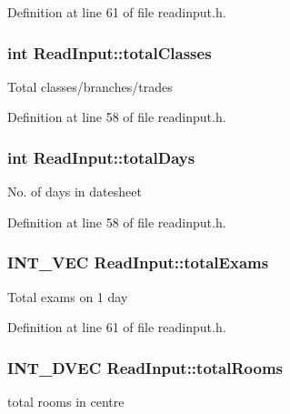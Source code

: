 Definition at line 61 of file readinput.\-h.

\hypertarget{classReadInput_a32d11288922cc26708b20324ae7b7a77}{
\subsubsection[{total\-Classes}]{\setlength{\rightskip}{0pt plus 5cm}int Read\-Input\-::total\-Classes\hspace{0.3cm}{\ttfamily [protected]}}}\label{classReadInput_a32d11288922cc26708b20324ae7b7a77}
Total classes/branches/trades 

Definition at line 58 of file readinput.\-h.

\hypertarget{classReadInput_a40dc15f03ab1d4c998aa48f2a7176574}{
\subsubsection[{total\-Days}]{\setlength{\rightskip}{0pt plus 5cm}int Read\-Input\-::total\-Days\hspace{0.3cm}{\ttfamily [protected]}}}\label{classReadInput_a40dc15f03ab1d4c998aa48f2a7176574}
No. of days in datesheet 

Definition at line 58 of file readinput.\-h.

\hypertarget{classReadInput_aa5fd69afc1c76686f37bcb20805ba551}{
\subsubsection[{total\-Exams}]{\setlength{\rightskip}{0pt plus 5cm}I\-N\-T\-\_\-\-V\-E\-C Read\-Input\-::total\-Exams\hspace{0.3cm}{\ttfamily [protected]}}}\label{classReadInput_aa5fd69afc1c76686f37bcb20805ba551}
Total exams on 1 day 

Definition at line 61 of file readinput.\-h.

\hypertarget{classReadInput_a21ae2519b9f3dc9ae938fc670995822f}{
\subsubsection[{total\-Rooms}]{\setlength{\rightskip}{0pt plus 5cm}I\-N\-T\-\_\-D\-V\-E\-C Read\-Input\-::total\-Rooms\hspace{0.3cm}{\ttfamily [protected]}}}\label{classReadInput_a21ae2519b9f3dc9ae938fc670995822f}
total rooms in centre 

